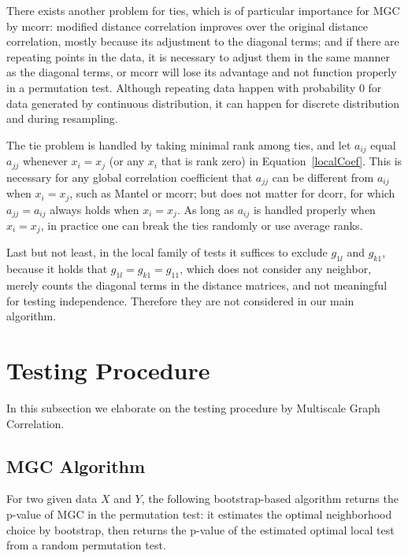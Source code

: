\documentclass[11pt]{article}
\begin{document}
There exists another problem for ties, which is of particular importance for MGC by mcorr: modified distance correlation improves over the original distance correlation, mostly because its adjustment to the diagonal terms; and if there are repeating points in the data, it is necessary to adjust them in the same manner as the diagonal terms, or mcorr will lose its advantage and not function properly in a permutation test. Although repeating data happen with probability $0$ for data generated by continuous distribution, it can happen for discrete distribution and during resampling.

The tie problem is handled by taking minimal rank among ties, and let $a_{ij}$ equal $a_{jj}$ whenever $x_{i}=x_{j}$ (or any $x_{i}$ that is rank zero) in Equation~\ref{localCoef}. This is necessary for any global correlation coefficient that $a_{jj}$ can be different from $a_{ij}$ when $x_{i}=x_{j}$, such as Mantel or mcorr; but does not matter for dcorr, for which $a_{jj}=a_{ij}$ always holds when $x_{i}=x_{j}$. As long as $a_{ij}$ is handled properly when $x_{i}=x_{j}$, in practice one can break the ties randomly or use average ranks.

Last but not least, in the local family of tests it suffices to exclude $g_{1l}$ and $g_{k1}$, because it holds that $g_{1l}=g_{k1}=g_{11}$, which does not consider any neighbor, merely counts the diagonal terms in the distance matrices, and not meaningful for testing independence. Therefore they are not considered in our main algorithm.

\section{Testing Procedure}
\label{main3}

In this subsection we elaborate on the testing procedure by Multiscale Graph Correlation.

\subsection{MGC Algorithm}

For two given data $X$ and $Y$, the following bootstrap-based algorithm returns the p-value of MGC in the permutation test: it estimates the optimal neighborhood choice by bootstrap, then returns the p-value of the estimated optimal local test from a random permutation test.
\end{document}
